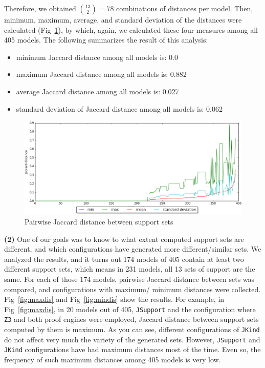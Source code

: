 Therefore, we obtained $\binom{13}{2} = 78$ combinations of distances per model. Then, minimum, maximum, average, and standard deviation of the distances were calculated (Fig~\ref{fig:jacdis}), by which, again, we calculated these four measures among all 405 models. The following summarizes the result of this analysis:
\begin{itemize}
  \item minimum Jaccard distance among all models is: 0.0
  \item maximum Jaccard distance among all models is: 0.882
  \item average Jaccard distance among all models is: 0.027
  \item standard deviation of Jaccard distance among all models is: 0.062
\end{itemize}


\begin{figure}
  \centering
  \includegraphics[width=\textwidth]{figs/jacdis.png}
  \caption{\small{Pairwise Jaccard distance between support sets}}\label{fig:jacdis}
\end{figure}

\vspace{6pt}
\noindent{}
 \vspace{9pt}

\textbf{(2)} One of our goals was to know to what extent computed support sets are different, and which configurations have generated more different/similar sets. We analyzed the results,
and it turns out 174 models of 405 contain at least two different support sets, which means in 231 models, all 13 sets of support are the same. For each of those 174 models, pairwise Jaccard distance between sets was compared, and configurations with maximum/ minimum distances were collected. Fig~\ref{fig:maxdis} and Fig~\ref{fig:mindis} show the results. For example, in Fig~\ref{fig:maxdis}, in 20 models out of 405, \texttt{JSupport} and the configuration where \texttt{Z3} and both proof engines were employed, Jaccard distance between support sets computed by them is maximum. As you can see, different configurations of \texttt{JKind} do not affect very much the variety of the generated sets. However, \texttt{JSupport} and \texttt{JKind} configurations have had maximum distances most of the time. Even so, the frequency of such maximum distances among 405 models is very low.


